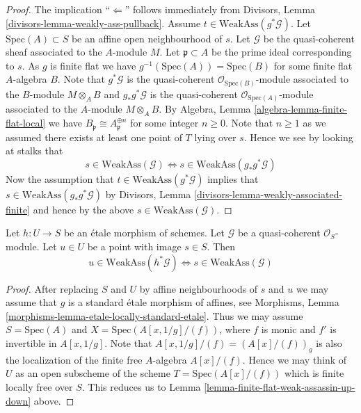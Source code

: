 \begin{proof}
The implication ``$\Leftarrow$'' follows immediately from
Divisors, Lemma \ref{divisors-lemma-weakly-ass-pullback}.
Assume $t \in \text{WeakAss}(g^*\mathcal{G})$.
Let $\text{Spec}(A) \subset S$ be an affine open neighbourhood of $s$.
Let $\mathcal{G}$ be the quasi-coherent sheaf associated to the $A$-module $M$.
Let $\mathfrak p \subset A$ be the prime ideal corresponding to $s$.
As $g$ is finite flat we have $g^{-1}(\text{Spec}(A)) = \text{Spec}(B)$
for some finite flat $A$-algebra $B$. Note that
$g^*\mathcal{G}$ is the quasi-coherent $\mathcal{O}_{\text{Spec}(B)}$-module
associated to the $B$-module $M \otimes_A B$ and $g_*g^*\mathcal{G}$ is the
quasi-coherent $\mathcal{O}_{\text{Spec}(A)}$-module associated to the
$A$-module $M \otimes_A B$. By
Algebra, Lemma \ref{algebra-lemma-finite-flat-local}
we have $B_{\mathfrak p} \cong A_{\mathfrak p}^{\oplus n}$
for some integer $n \geq 0$. Note that $n \geq 1$ as we assumed there
exists at least one point of $T$ lying over $s$. Hence we see by
looking at stalks that
$$
s \in \text{WeakAss}(\mathcal{G})
\Leftrightarrow
s \in \text{WeakAss}(g_*g^*\mathcal{G})
$$
Now the assumption that $t \in \text{WeakAss}(g^*\mathcal{G})$
implies that $s \in \text{WeakAss}(g_*g^*\mathcal{G})$ by
Divisors, Lemma \ref{divisors-lemma-weakly-associated-finite}
and hence by the above $s \in  \text{WeakAss}(\mathcal{G})$.
\end{proof}

\begin{lemma}
\label{lemma-etale-weak-assassin-up-down}
Let $h : U \to S$ be an \'etale morphism of schemes.
Let $\mathcal{G}$ be a quasi-coherent $\mathcal{O}_S$-module.
Let $u \in U$ be a point with image $s \in S$. Then
$$
u \in \text{WeakAss}(h^*\mathcal{G})
\Leftrightarrow
s \in \text{WeakAss}(\mathcal{G})
$$
\end{lemma}

\begin{proof}
After replacing $S$ and $U$ by affine neighbourhoods of $s$ and $u$
we may assume that $g$ is a standard \'etale morphism of affines, see
Morphisms, Lemma \ref{morphisms-lemma-etale-locally-standard-etale}.
Thus we may assume $S = \text{Spec}(A)$ and
$X = \text{Spec}(A[x, 1/g]/(f))$, where $f$ is monic and $f'$
is invertible in $A[x, 1/g]$.
Note that $A[x, 1/g]/(f) = (A[x]/(f))_g$ is also the localization
of the finite free $A$-algebra $A[x]/(f)$. Hence we may think of
$U$ as an open subscheme of the scheme $T = \text{Spec}(A[x]/(f))$
which is finite locally free over $S$. This reduces us to 
Lemma \ref{lemma-finite-flat-weak-assassin-up-down}
above.
\end{proof}





